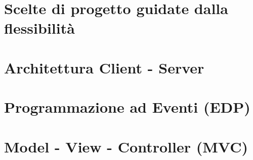 
\section{Scelte di progetto guidate dalla flessibilità}

\section{Architettura Client - Server}

\section{Programmazione ad Eventi (EDP)}

\section{Model - View - Controller (MVC)}




